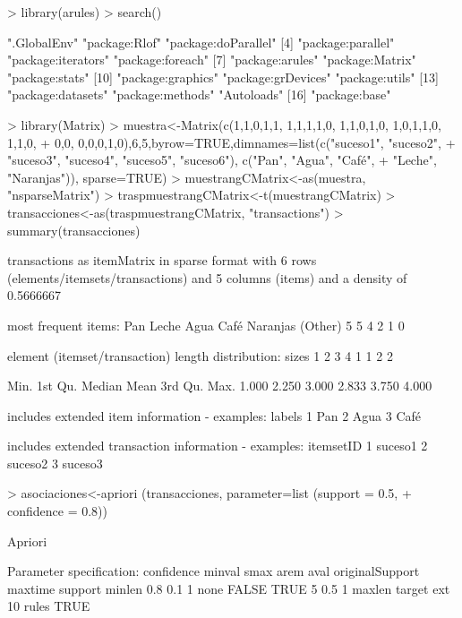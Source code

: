 \documentclass[a4paper, 12pt]{article}
\begin{document}
\begin{Schunk}
\begin{Sinput}
> library(arules)
> search()
\end{Sinput}
\begin{Soutput}
 [1] ".GlobalEnv"         "package:Rlof"       "package:doParallel"
 [4] "package:parallel"   "package:iterators"  "package:foreach"   
 [7] "package:arules"     "package:Matrix"     "package:stats"     
[10] "package:graphics"   "package:grDevices"  "package:utils"     
[13] "package:datasets"   "package:methods"    "Autoloads"         
[16] "package:base"      
\end{Soutput}
\begin{Sinput}
> library(Matrix)
> muestra<-Matrix(c(1,1,0,1,1, 1,1,1,1,0, 1,1,0,1,0, 1,0,1,1,0, 1,1,0,
+ 0,0, 0,0,0,1,0),6,5,byrow=TRUE,dimnames=list(c("suceso1", "suceso2",
+ "suceso3", "suceso4", "suceso5", "suceso6"), c("Pan", "Agua", "Café",
+ "Leche", "Naranjas")), sparse=TRUE)
> muestrangCMatrix<-as(muestra, "nsparseMatrix")
> traspmuestrangCMatrix<-t(muestrangCMatrix)
> transacciones<-as(traspmuestrangCMatrix, "transactions")
> summary(transacciones)
\end{Sinput}
\begin{Soutput}
transactions as itemMatrix in sparse format with
 6 rows (elements/itemsets/transactions) and
 5 columns (items) and a density of 0.5666667 

most frequent items:
     Pan    Leche     Agua     Café Naranjas  (Other) 
       5        5        4        2        1        0 

element (itemset/transaction) length distribution:
sizes
1 2 3 4 
1 1 2 2 

   Min. 1st Qu.  Median    Mean 3rd Qu.    Max. 
  1.000   2.250   3.000   2.833   3.750   4.000 

includes extended item information - examples:
  labels
1    Pan
2   Agua
3   Café

includes extended transaction information - examples:
  itemsetID
1   suceso1
2   suceso2
3   suceso3
\end{Soutput}
\begin{Sinput}
> asociaciones<-apriori (transacciones, parameter=list (support = 0.5,
+ confidence = 0.8))
\end{Sinput}
\begin{Soutput}
Apriori

Parameter specification:
 confidence minval smax arem  aval originalSupport maxtime support minlen
        0.8    0.1    1 none FALSE            TRUE       5     0.5      1
 maxlen target  ext
     10  rules TRUE


\end{Soutput}
\end{Schunk}
\end{document}
